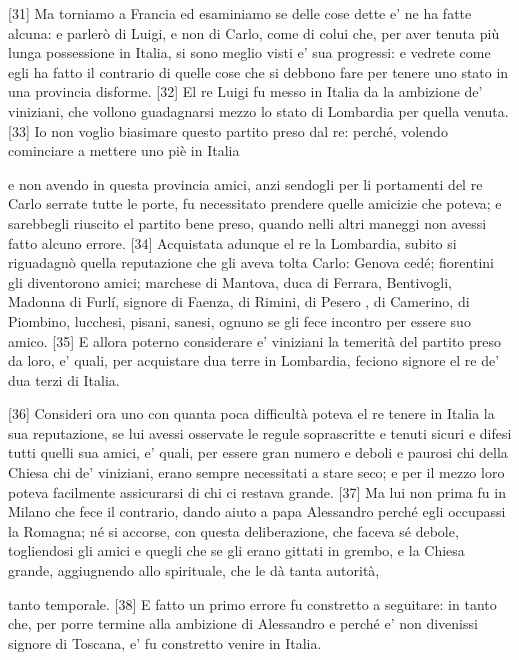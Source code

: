 {[}31{]} Ma torniamo a Francia ed esaminiamo se delle cose dette e' ne
ha fatte alcuna: e parlerò di Luigi, e non di Carlo, come di colui che,
per aver tenuta più lunga possessione in Italia, si sono meglio visti e'
sua progressi: e vedrete come egli ha fatto il contrario di quelle cose
che si debbono fare per tenere uno stato in una provincia disforme.
{[}32{]} El re Luigi fu messo in Italia da la ambizione de' viniziani,
che vollono guadagnarsi mezzo lo stato di Lombardia per quella venuta.
{[}33{]} Io non voglio biasimare questo partito preso dal re: perché,
volendo cominciare a mettere uno piè in Italia

\quebra

\noindent{}e non avendo in questa
provincia amici, anzi sendogli per li portamenti del re Carlo serrate
tutte le porte, fu necessitato prendere quelle amicizie che poteva; e
sarebbegli riuscito el partito bene preso, quando nelli altri maneggi
non avessi fatto alcuno errore. {[}34{]} Acquistata adunque el re la
Lombardia, subito si riguadagnò quella reputazione che gli aveva tolta
Carlo: Genova cedé; fiorentini gli diventorono amici; marchese di
Mantova, duca di Ferrara, Bentivogli, Madonna di Furlí, signore di
Faenza, di Rimini, di Pesero , di Camerino, di Piombino, lucchesi,
pisani, sanesi, ognuno se gli fece incontro per essere suo amico.
{[}35{]} E allora poterno considerare e' viniziani la temerità del
partito preso da loro, e' quali, per acquistare dua terre in Lombardia,
feciono signore el re de' dua terzi di Italia.

{[}36{]} Consideri ora uno con quanta poca difficultà poteva el re
tenere in Italia la sua reputazione, se lui avessi osservate le regule
soprascritte e tenuti sicuri e difesi tutti quelli sua amici, e' quali,
per essere gran numero e deboli e paurosi chi della Chiesa chi de'
viniziani, erano sempre necessitati a stare seco; e per il mezzo loro
poteva facilmente assicurarsi di chi ci restava grande. {[}37{]} Ma lui
non prima fu in Milano che fece il contrario, dando aiuto a papa
Alessandro perché egli occupassi la Romagna; né si accorse, con questa
deliberazione, che faceva sé debole, togliendosi gli amici e quegli che
se gli erano gittati in grembo, e la Chiesa grande, aggiugnendo allo
spirituale, che le dà tanta autorità,

\quebra

\noindent{}tanto temporale. {[}38{]} E fatto
un primo errore fu constretto a seguitare: in tanto che, per porre
termine alla ambizione di Alessandro e perché e' non divenissi signore
di Toscana, e' fu constretto venire in Italia.

